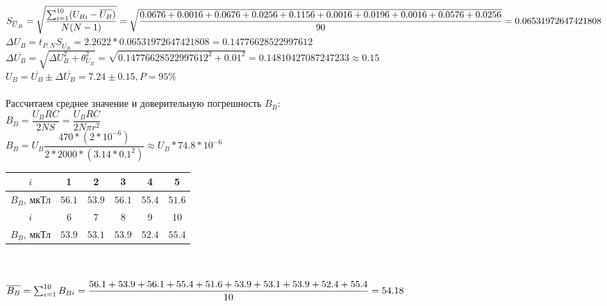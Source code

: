 $
S_{\overline U_B} = 
\sqrt{
	\dfrac
	{
		\sum_{i=1}^{10}(U_{Bi} - \overline{U_B})
	}
	{
		N(N-1)
	}
}
=\\
\sqrt{
	\dfrac
	{
		0.0676 + 0.0016 + 0.0676 + 0.0256 + 0.1156 + 0.0016 + 0.0196 + 0.0016 + 0.0576 + 0.0256
	}
	{
		90
	}
}
=\\
0.06531972647421808
$
\\

$ 
\varDelta U_B = 
t_{P,N}S_{\overline{U_B}} = 
2.2622 * 0.06531972647421808 = 
0.14776628522997612
$
\\

$ 
\varDelta \overline{U_B} = 
\sqrt{\varDelta U_B^2 + \theta_{U_B}^2} =
\sqrt{0.14776628522997612^2 + 0.01^2} = 
0.14810427087247233 \approx 
0.15
$
\\

$ U_B = 
\overline{U_B} \pm \varDelta \overline{U_B} = 
7.24 \pm 0.15, P = 95\%
$
\\

\ \\ 

Рассчитаем среднее значение и доверительную погрешность $ B_B $:\\

$
B_B = 
\dfrac{U_B RC}{2NS} = 
\dfrac{U_B RC}{2N\pi r^2} 
$
\\

$
B_B = 
U_B \dfrac{470 * (2 * 10^{-6})}{2 * 2000 * (3.14 * 0.1^2)} \approx 
U_B * 74.8 * 10^{-6} 
$
\\

\begin{tabular}{|c|c|c|c|c|c|}
	\hline
	$ i $   & 1 & 2 & 3 & 4 & 5 \\
	\hline
	$ B_B $, мкТл & $ 56.1 $ & $ 53.9 $ & $ 56.1 $ & $ 55.4 $ & $ 51.6 $ \\
	\hline
	$ i $   & 6 & 7 & 8 & 9 & 10 \\
	\hline
	$ B_B $, мкТл & $ 53.9 $ & $ 53.1 $ & $ 53.9 $ & $ 52.4 $ & $ 55.4 $ \\
	\hline
\end{tabular}
\\
\\

$ 
\overline{B_{B}}= 
\sum_{i=1}^{10} B_{Bi} = 
\dfrac{56.1 + 53.9 + 56.1 + 55.4 + 51.6 + 53.9 + 53.1 + 53.9 + 52.4 + 55.4}{10} = \\
54.18
$
\\

